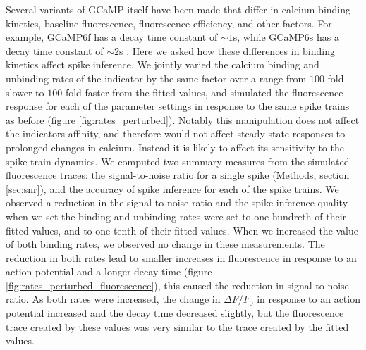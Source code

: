 \documentclass[a4paper,12pt]{article}
\theoremstyle{definition}
\begin{document}
Several variants of GCaMP itself have been made that differ in calcium binding kinetics, baseline fluorescence, fluorescence efficiency, and other factors. For example, GCaMP6f has a decay time constant of $\sim 1$s, while GCaMP6s has a decay time constant of $\sim 2$s \cite{chen}. Here we asked how these differences in binding kinetics affect spike inference. We jointly varied the calcium binding and unbinding rates of the indicator by the same factor over a range from $100$-fold slower to $100$-fold faster from the fitted values, and simulated the fluorescence response for each of the parameter settings in response to the same spike trains as before (figure \ref{fig:rates_perturbed}). Notably this manipulation does not affect the indicators affinity, and therefore would not affect steady-state responses to prolonged changes in calcium. Instead it is likely to affect its sensitivity to the spike train dynamics. We computed two summary measures from the simulated fluorescence traces: the signal-to-noise ratio for a single spike (Methods, section \ref{sec:snr}), and the accuracy of spike inference for each of the spike trains. We observed a reduction in the signal-to-noise ratio and the spike inference quality when we set the binding and unbinding rates were set to one hundreth of their fitted values, and to one tenth of their fitted values. When we increased the value of both binding rates, we observed no change in these measurements. The reduction in both rates lead to smaller increases in fluorescence in response to an action potential and a longer decay time (figure \ref{fig:rates_perturbed_fluorescence}), this caused the reduction in signal-to-noise ratio. As both rates were increased, the change in $\Delta F/F_0$ in response to an action potential increased and the decay time decreased slightly, but the fluorescence trace created by these values was very similar to the trace created by the fitted values.
\end{document}

